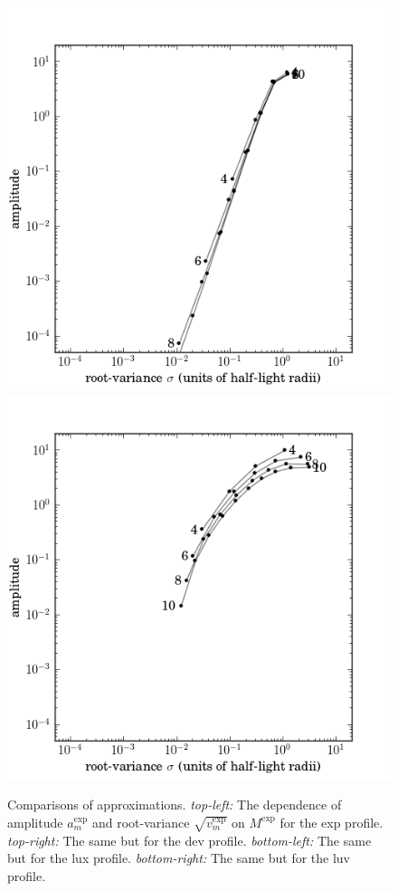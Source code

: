\documentclass[12pt,pdftex,preprint]{aastex}
\newlength{\figurewidth}
\begin{document}
\begin{figure}
\includegraphics[width=\figurewidth]{mixtures_vs_K_lux.png}%
\includegraphics[width=\figurewidth]{mixtures_vs_K_luv.png}
\caption{Comparisons of approximations.  \textsl{top-left:} The
  dependence of amplitude $a^{\exp}_m$ and root-variance
  $\sqrt{v^{\exp}_m}$ on $M^{\exp}$ for the exp profile.
  \textsl{top-right:} The same but for the dev profile.
  \textsl{bottom-left:} The same but for the lux profile.
  \textsl{bottom-right:} The same but for the luv profile.\label{fig:M}}
\end{figure}
\end{document}
